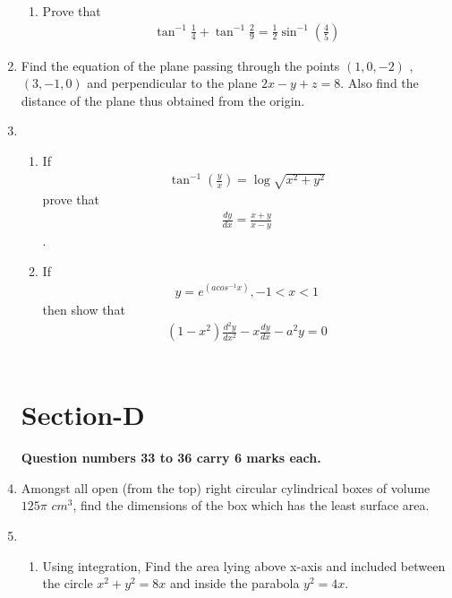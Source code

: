 \documentclass[journal,12pt,twocolumn]{IEEEtran}
\renewcommand\thesection{\arabic{section}}
\begin{document}
\begin{enumerate}[label=\thesection.\arabic*.,ref=\thesection.\theenumi]
\begin{enumerate}
\item Prove that \begin{align} \tan^{-1} \frac{1}{4} + \tan^{-1} \frac{2}{9} = \frac{1}{2} \sin^{-1} (\frac{4}{5}) \nonumber \end{align}
 \end{enumerate}

\item Find the equation of the plane passing through the points $(1,0,-2)$ , $(3,-1,0)$ and perpendicular to the plane $ 2x-y+z=8 $. Also find the distance of the plane thus obtained from the origin.\\

\item \begin{enumerate} \item If \begin{align} \tan^{-1}(\frac{y}{x})=\log \sqrt{x^2+y^2} \nonumber \end{align}  prove that \begin{align} \frac{dy}{dx}=\frac{x+y}{x-y} \nonumber \end{align}.

\item If  \begin{align} y=e^{(acos^{-1}x)}  , -1 < x < 1 \nonumber \end{align}  then show that  \begin{align} (1-x^2) \frac{d^2y}{dx^2} - x \frac{dy}{dx} - a^2y =0 \nonumber \end{align}\\
\end{enumerate}

 \section{Section-D}
 
 \textbf{Question numbers 33 to 36 carry 6 marks each.}\\
 
 \item Amongst all open (from the top) right circular cylindrical boxes of volume $125 \pi $ $cm^3$, find the dimensions of the box which has the least surface area.\\  
 
 \item \begin{enumerate} \item Using integration, Find the area lying above x-axis and included between the circle $ x^2 + y^2 =8x $ and inside the parabola $ y^2 =4x $.   
    

\end{enumerate}
\end{enumerate}
\end{document}
